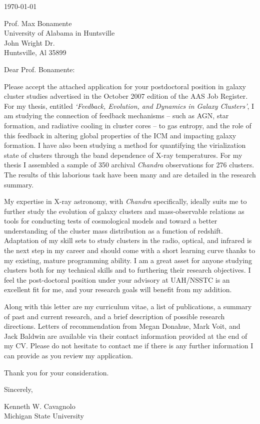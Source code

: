 \documentclass[11pt]{article}
\begin{document}
\today

Prof. Max Bonamente\\
University of Alabama in Huntsville\\
John Wright Dr.\\
Huntsville, Al 35899

Dear Prof. Bonamente:

Please accept the attached application for your postdoctoral
position in galaxy cluster studies advertised in the October 2007 edition
of the AAS Job Register. For my thesis, entitled {\textit{`Feedback,
Evolution, and Dynamics in Galaxy Clusters'}}, I am studying
the connection of feedback mechanisms -- such as AGN, star formation, and
radiative cooling in cluster cores -- to gas entropy, and the role
of this feedback in altering global properties of the ICM and 
impacting galaxy formation. I have also been studying a method for
quantifying the virialization state of clusters through the band
dependence of X-ray temperatures. For my thesis I assembled a sample
of 350 archival {\textit{Chandra}} observations for 276 clusters. The
results of this laborious task have been many and are detailed in the
research summary.

My expertise in X-ray astronomy, with {\textit{Chandra}}
specifically, ideally suits me to further study the evolution of
galaxy clusters and mass-observable relations as tools for
conducting tests of cosmological models and toward a better understanding
of the cluster mass distribution as a function of
redshift. Adaptation of my skill sets to study clusters in the radio,
optical, and infrared is the next step in my career and should come
with a short learning curve thanks to my existing, mature programming
ability. I am a great asset for anyone studying clusters both for my
technical skills and to furthering their research objectives. I feel
the post-doctoral position under your advisory at UAH/NSSTC is an
excellent fit for me, and your research goals will benefit from my
addition.

Along with this letter are my curriculum vitae, a list of
publications, a summary of past and current research, and a brief
description of possible research directions. Letters of
recommendation from Megan Donahue, Mark Voit, and Jack Baldwin
are available via their contact information provided at the end of my
CV. Please do not hesitate to contact me if there is any
further information I can provide as you review my application.

Thank you for your consideration.

Sincerely,\\
\begin{minipage}{7.5in}
\end{minipage}
Kenneth W. Cavagnolo\\
Michigan State University
\end{document}
